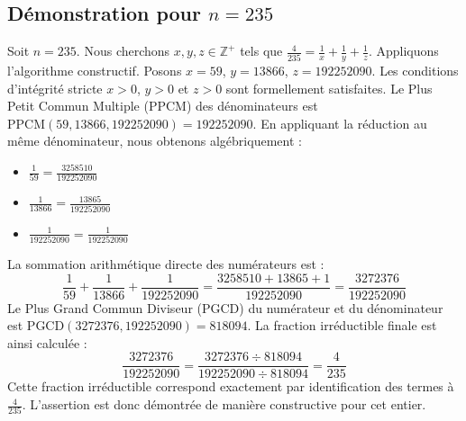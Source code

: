 \documentclass[11pt,a4paper]{article}
\begin{document}
\subsection{Démonstration pour $n = 235$}
Soit $n = 235$. Nous cherchons $x, y, z \in \mathbb{Z}^{+}$ tels que $\frac{4}{235} = \frac{1}{x} + \frac{1}{y} + \frac{1}{z}$.
Appliquons l'algorithme constructif. Posons $x = 59$, $y = 13866$, $z = 192252090$.
Les conditions d'intégrité stricte $x > 0$, $y > 0$ et $z > 0$ sont formellement satisfaites.
Le Plus Petit Commun Multiple (PPCM) des dénominateurs est $\text{PPCM}(59, 13866, 192252090) = 192252090$.
En appliquant la réduction au même dénominateur, nous obtenons algébriquement :
\begin{itemize}
    \item $\frac{1}{59} = \frac{3258510}{192252090}$
    \item $\frac{1}{13866} = \frac{13865}{192252090}$
    \item $\frac{1}{192252090} = \frac{1}{192252090}$
\end{itemize}
La sommation arithmétique directe des numérateurs est :
$$ \frac{1}{59} + \frac{1}{13866} + \frac{1}{192252090} = \frac{3258510 + 13865 + 1}{192252090} = \frac{3272376}{192252090} $$
Le Plus Grand Commun Diviseur (PGCD) du numérateur et du dénominateur est $\text{PGCD}(3272376, 192252090) = 818094$.
La fraction irréductible finale est ainsi calculée :
$$ \frac{3272376}{192252090} = \frac{3272376 \div 818094}{192252090 \div 818094} = \frac{4}{235} $$
Cette fraction irréductible correspond exactement par identification des termes à $\frac{4}{235}$. L'assertion est donc démontrée de manière constructive pour cet entier.
\end{document}
